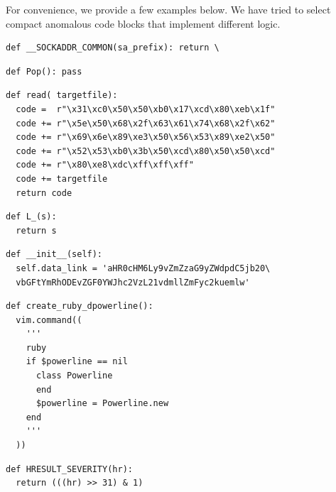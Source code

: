 \documentclass[conference]{ieeetran}
\begin{document}
For convenience, we provide a few examples below.
We have tried to select compact anomalous code blocks that implement different logic.


\begin{verbatim}
def __SOCKADDR_COMMON(sa_prefix): return \
\end{verbatim}

\begin{verbatim}
def Pop(): pass
\end{verbatim}

\begin{verbatim}
def read( targetfile):
  code =  r"\x31\xc0\x50\x50\xb0\x17\xcd\x80\xeb\x1f"
  code += r"\x5e\x50\x68\x2f\x63\x61\x74\x68\x2f\x62"
  code += r"\x69\x6e\x89\xe3\x50\x56\x53\x89\xe2\x50"
  code += r"\x52\x53\xb0\x3b\x50\xcd\x80\x50\x50\xcd"
  code += r"\x80\xe8\xdc\xff\xff\xff"
  code += targetfile
  return code
\end{verbatim}

\begin{verbatim}
def L_(s):
  return s
\end{verbatim}

\begin{verbatim}
def __init__(self):
  self.data_link = 'aHR0cHM6Ly9vZmZzaG9yZWdpdC5jb20\
  vbGFtYmRhODEvZGF0YWJhc2VzL21vdmllZmFyc2kuemlw'
\end{verbatim}

\begin{verbatim}
def create_ruby_dpowerline():
  vim.command((
    '''
    ruby
    if $powerline == nil
      class Powerline
      end
      $powerline = Powerline.new
    end
    '''
  ))
\end{verbatim}

\begin{verbatim}
def HRESULT_SEVERITY(hr):
  return (((hr) >> 31) & 1)
\end{verbatim}
\end{document}
